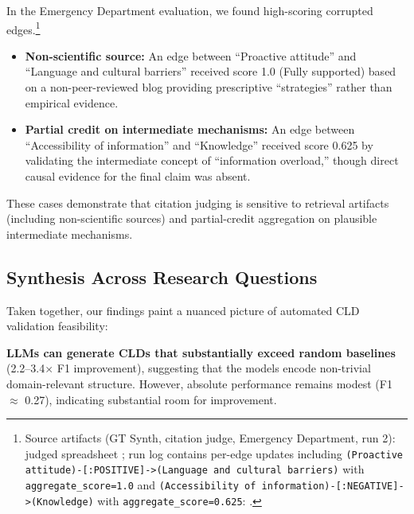 In the Emergency Department evaluation, we found high-scoring corrupted edges.\footnote{Source artifacts (GT Synth, citation judge, Emergency Department, run 2): judged spreadsheet \texttt{}; run log contains per-edge updates including \texttt{(Proactive attitude)-[:POSITIVE]->(Language and cultural barriers)} with \texttt{aggregate\_score=1.0} and \texttt{(Accessibility of information)-[:NEGATIVE]->(Knowledge)} with \texttt{aggregate\_score=0.625}: \texttt{}.}%
\begin{itemize}[noitemsep]
    \item \textbf{Non-scientific source:} An edge between ``Proactive attitude'' and ``Language and cultural barriers'' received score 1.0 (Fully supported) based on a non-peer-reviewed blog providing prescriptive ``strategies'' rather than empirical evidence.
    \item \textbf{Partial credit on intermediate mechanisms:} An edge between ``Accessibility of information'' and ``Knowledge'' received score 0.625 by validating the intermediate concept of ``information overload,'' though direct causal evidence for the final claim was absent.
\end{itemize}

These cases demonstrate that citation judging is sensitive to retrieval artifacts (including non-scientific sources) and partial-credit aggregation on plausible intermediate mechanisms.

\subsection{Synthesis Across Research Questions}
\label{sec:discussion_synthesis}

Taken together, our findings paint a nuanced picture of automated CLD validation feasibility:

\textbf{LLMs can generate CLDs that substantially exceed random baselines} (2.2--3.4$\times$ F1 improvement), suggesting that the models encode non-trivial domain-relevant structure. However, absolute performance remains modest (F1 $\approx$ 0.27), indicating substantial room for improvement.

